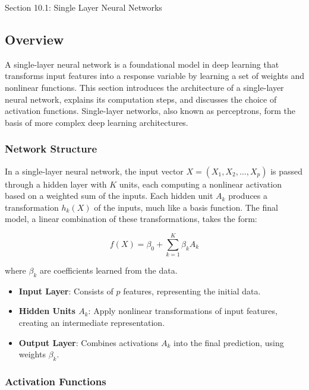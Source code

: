 \begin{notes}{Section 10.1: Single Layer Neural Networks}
    \subsection*{Overview}

    A single-layer neural network is a foundational model in deep learning that transforms input features into a response variable by learning a set of weights and nonlinear functions. This section introduces 
    the architecture of a single-layer neural network, explains its computation steps, and discusses the choice of activation functions. Single-layer networks, also known as perceptrons, form the basis of 
    more complex deep learning architectures.
    
    \subsubsection*{Network Structure}
    
    In a single-layer neural network, the input vector $X = (X_1, X_2, \ldots, X_p)$ is passed through a hidden layer with $K$ units, each computing a nonlinear activation based on a weighted 
    sum of the inputs. Each hidden unit $A_k$ produces a transformation $h_k(X)$ of the inputs, much like a basis function. The final model, a linear combination of these transformations, takes 
    the form:
    
    \[
    f(X) = \beta_0 + \sum_{k=1}^K \beta_k A_k
    \]
    
    where $\beta_k$ are coefficients learned from the data.
    
    \begin{highlight}
        \begin{itemize}
            \item \textbf{Input Layer}: Consists of $p$ features, representing the initial data.
            \item \textbf{Hidden Units $A_k$}: Apply nonlinear transformations of input features, creating an intermediate representation.
            \item \textbf{Output Layer}: Combines activations $A_k$ into the final prediction, using weights $\beta_k$.
        \end{itemize}
    \end{highlight}
    
    \subsubsection*{Activation Functions}
    

\end{notes}
